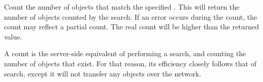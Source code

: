 Count the number of objects that match the specified .  This will
return the number of objects counted by the search.  If an error occurs during
the count, the count may reflect a partial count.  The real count will be higher
than the returned value.

A count is the server-side equivalent of performing a search, and counting the
number of objects that exist.  For that reason, its efficiency closely follows
that of search, except it will not transfer any objects over the network.
